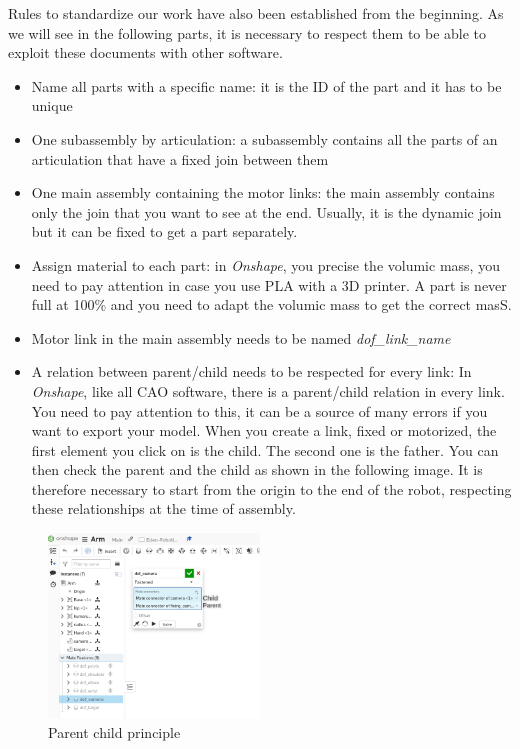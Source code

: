 Rules to standardize our work have also been established from the beginning. As we will see in the following parts, it is necessary to respect them to be able to exploit these documents with other software.
\begin{itemize}
    \item Name all parts with a specific name: it is the ID of the part and it has to be unique
    \item One subassembly by articulation: a subassembly contains all the parts of an articulation that have a fixed join between them
    \item One main assembly containing the motor links: the main assembly contains only the join that you want to see at the end. Usually, it is the dynamic join but it can be fixed to get a part separately.
    \item Assign material to each part: in \textit{Onshape}, you precise the volumic mass, you need to pay attention in case you use PLA with a 3D printer. A part is never full at 100\% and you need to adapt the volumic mass to get the correct masS.
    \item Motor link in the main assembly needs to be named \textit{dof\_\less link\_name\bg}
    \item A relation between parent/child needs to be respected for every link: In \textit{Onshape}, like all CAO software, there is a parent/child relation in every link. You need to pay attention to this, it can be a source of many errors if you want to export your model. When you create a link, fixed or motorized, the first element you click on is the child. The second one is the father. You can then check the parent and the child as shown in the following image. It is therefore necessary to start from the origin to the end of the robot, respecting these relationships at the time of assembly.
\end{itemize}
\begin{figure}[H]
    \centering
    \includegraphics[width=0.5\textwidth]{Images/Section03/Parent_Child.png}
    \caption{Parent child principle}
    \label{fig:ParentChild}
\end{figure}

